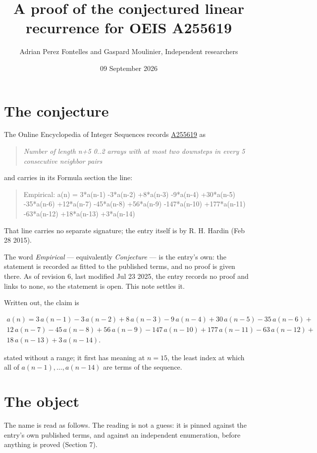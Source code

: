 \documentclass[11pt]{article}
\title{A proof of the conjectured linear recurrence for OEIS A255619}
\author{Adrian Perez Fontelles and Gaspard Moulinier, Independent researchers}
\date{09 September 2026}
\theoremstyle{definition}
\begin{document}
\maketitle
\section{The conjecture}

The Online Encyclopedia of Integer Sequences records \href{https://oeis.org/A255619}{A255619} as

\begin{quote}\itshape Number of length n+5 0..2 arrays with at most two downsteps in every 5 consecutive neighbor pairs\end{quote}

and carries in its Formula section the line:

\begin{quote}\ttfamily Empirical: a(n) = 3*a(n-1) -3*a(n-2) +8*a(n-3) -9*a(n-4) +30*a(n-5) -35*a(n-6) +12*a(n-7) -45*a(n-8) +56*a(n-9) -147*a(n-10) +177*a(n-11) -63*a(n-12) +18*a(n-13) +3*a(n-14)\end{quote}

That line carries no separate signature; the entry itself is by R. H. Hardin (Feb 28 2015).

The word {\itshape Empirical} --- equivalently {\itshape Conjecture} --- is the entry's own: the statement is recorded as fitted to the published terms, and no proof is given there. As of revision 6, last modified Jul 23 2025, the entry records no proof and links to none, so the statement is open. This note settles it.

Written out, the claim is

\begin{multline*} a(n) = 3\,a(n-1) - 3\,a(n-2) + 8\,a(n-3) - 9\,a(n-4) + 30\,a(n-5) - 35\,a(n-6) + \\ 12\,a(n-7) - 45\,a(n-8) + 56\,a(n-9) - 147\,a(n-10) + 177\,a(n-11) - 63\,a(n-12) + \\ 18\,a(n-13) + 3\,a(n-14). \end{multline*}

stated without a range; it first has meaning at $n = 15$, the least index at which all of $a(n-1),\dots,a(n-14)$ are terms of the sequence.

\section{The object}

The name is read as follows. The reading is not a guess: it is pinned against the entry's own published terms, and against an independent enumeration, before anything is proved (Section 7).
\end{document}
